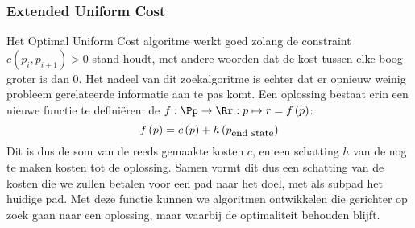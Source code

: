 \subsubsection{Extended Uniform Cost}
Het Optimal Uniform Cost algoritme werkt goed zolang de constraint $c\left(p_i,p_{i+1}\right)>0$ stand houdt, met andere woorden dat de kost tussen elke boog groter is dan 0. Het nadeel van dit zoekalgoritme is echter dat er opnieuw weinig probleem gerelateerde informatie aan te pas komt. Een oplossing bestaat erin een nieuwe functie te defini\"eren: de  $f:\Pp\rightarrow\Rr:p\mapsto r=f\left(p\right)$:
\begin{equation}
f\left(p\right)=c\left(p\right)+h\left(p_{\mbox{\small{end state}}}\right)
\end{equation}
Dit is dus de som van de reeds gemaakte kosten $c$, en een schatting $h$ van de nog te maken kosten tot de oplossing. Samen vormt dit dus een schatting van de kosten die we zullen betalen voor een pad naar het doel, met als subpad het huidige pad. Met deze functie kunnen we algoritmen ontwikkelen die gerichter op zoek gaan naar een oplossing, maar waarbij de optimaliteit behouden blijft.
